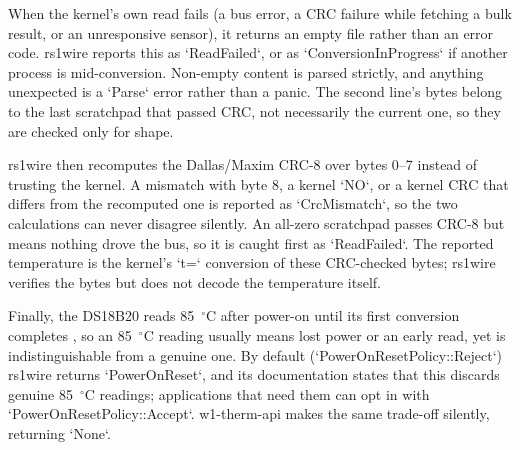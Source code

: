 \documentclass[conference]{IEEEtran}
\begin{document}
When the kernel's own read fails (a bus error, a CRC failure while fetching a bulk result, or an unresponsive sensor), it returns an empty file rather than an error code. rs1wire reports this as `ReadFailed`, or as `ConversionInProgress` if another process is mid-conversion.
Non-empty content is parsed strictly, and anything unexpected is a `Parse` error rather than a panic.
The second line's bytes belong to the last scratchpad that passed CRC, not necessarily the current one, so they are checked only for shape.

rs1wire then recomputes the Dallas/Maxim CRC-8 over bytes 0--7 instead of trusting the kernel.
A mismatch with byte 8, a kernel `NO`, or a kernel CRC that differs from the recomputed one is reported as `CrcMismatch`, so the two calculations can never disagree silently.
An all-zero scratchpad passes CRC-8 but means nothing drove the bus, so it is caught first as `ReadFailed`.
The reported temperature is the kernel's `t=` conversion of these CRC-checked bytes; rs1wire verifies the bytes but does not decode the temperature itself.

Finally, the DS18B20 reads 85~$^\circ$C after power-on until its first conversion completes \cite{ds18b20_datasheet}, so an 85~$^\circ$C reading usually means lost power or an early read, yet is indistinguishable from a genuine one.
By default (`PowerOnResetPolicy::Reject`) rs1wire returns `PowerOnReset`, and its documentation states that this discards genuine 85~$^\circ$C readings; applications that need them can opt in with `PowerOnResetPolicy::Accept`. w1-therm-api makes the same trade-off silently, returning `None`.

\end{document}
